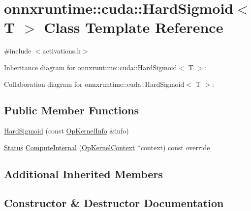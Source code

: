 \hypertarget{classonnxruntime_1_1cuda_1_1HardSigmoid}{}\section{onnxruntime\+:\+:cuda\+:\+:Hard\+Sigmoid$<$ T $>$ Class Template Reference}
\label{classonnxruntime_1_1cuda_1_1HardSigmoid}


{\ttfamily \#include $<$activations.\+h$>$}



Inheritance diagram for onnxruntime\+:\+:cuda\+:\+:Hard\+Sigmoid$<$ T $>$\+:


Collaboration diagram for onnxruntime\+:\+:cuda\+:\+:Hard\+Sigmoid$<$ T $>$\+:
\subsection*{Public Member Functions}
\begin{DoxyCompactItemize}
\item 
\mbox{\hyperlink{classonnxruntime_1_1cuda_1_1HardSigmoid_a0f0541c74f3889167548e21ec9e6024d}{Hard\+Sigmoid}} (const \mbox{\hyperlink{classonnxruntime_1_1OpKernelInfo}{Op\+Kernel\+Info}} \&info)
\item 
\mbox{\hyperlink{classonnxruntime_1_1common_1_1Status}{Status}} \mbox{\hyperlink{classonnxruntime_1_1cuda_1_1HardSigmoid_a7b94a8b92e87ff5eac2d37561b13bdc9}{Compute\+Internal}} (\mbox{\hyperlink{classonnxruntime_1_1OpKernelContext}{Op\+Kernel\+Context}} $\ast$context) const override
\end{DoxyCompactItemize}
\subsection*{Additional Inherited Members}


\subsection{Constructor \& Destructor Documentation}
\mbox{\label{classonnxruntime_1_1cuda_1_1HardSigmoid_a0f0541c74f3889167548e21ec9e6024d}} 
